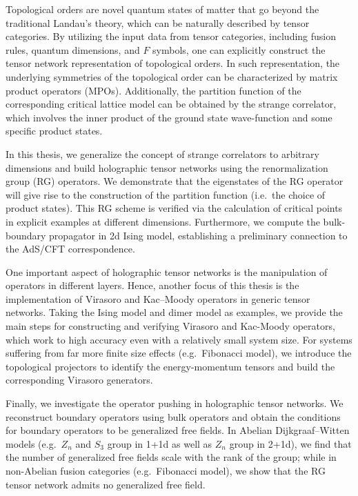 \begin{abstract*}

Topological orders are novel quantum states of matter that go beyond the traditional Landau's theory, which can be naturally described by tensor categories. By utilizing the input data from tensor categories, including fusion rules, quantum dimensions, and $F$ symbols, one can explicitly construct the tensor network representation of topological orders. In such representation, the underlying symmetries of the topological order can be characterized by matrix product operators (MPOs). Additionally, the partition function of the corresponding critical lattice model can be obtained by the strange correlator, which involves the inner product of the ground state wave-function and some specific product states.

In this thesis, we generalize the concept of strange correlators to arbitrary dimensions and build holographic tensor networks using the renormalization group (RG) operators. We demonstrate that the eigenstates of the RG operator will give rise to the construction of the partition function (i.e.\ the choice of product states). This RG scheme is verified via the calculation of critical points in explicit examples at different dimensions. Furthermore, we compute the bulk-boundary propagator in 2d Ising model, establishing a preliminary connection to the AdS/CFT correspondence.

One important aspect of holographic tensor networks is the manipulation of operators in different layers. Hence, another focus of this thesis is the implementation of Virasoro and Kac--Moody operators in generic tensor networks. Taking the Ising model and dimer model as examples, we provide the main steps for constructing and verifying Virasoro and Kac-Moody operators, which work to high accuracy even with a relatively small system size. For systems suffering from far more finite size effects (e.g.\ Fibonacci model), we introduce the topological projectors to identify the energy-momentum tensors and build the corresponding Virasoro generators.

Finally, we investigate the operator pushing in holographic tensor networks. We reconstruct boundary operators using bulk operators and obtain the conditions for boundary operators to be generalized free fields. In Abelian Dijkgraaf--Witten models (e.g.\ $Z_n$ and $S_3$ group in 1+1d as well as $Z_n$ group in 2+1d), we find that the number of generalized free fields scale with the rank of the group; while in non-Abelian fusion categories (e.g.\ Fibonacci model), we show that the RG tensor network admits no generalized free field.

\end{abstract*}
